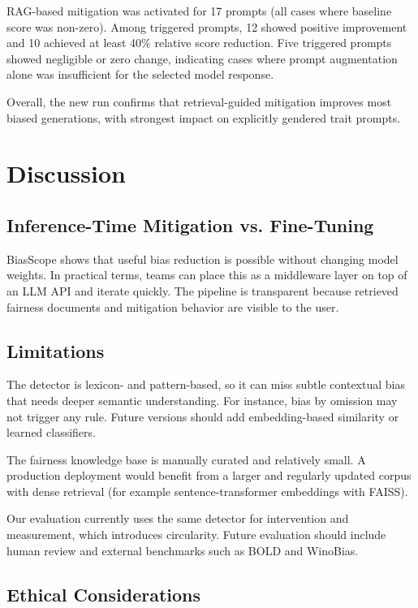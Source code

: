 \documentclass[conference]{IEEEtran}
\begin{document}
RAG-based mitigation was activated for 17 prompts (all cases where baseline score was non-zero). Among triggered prompts, 12 showed positive improvement and 10 achieved at least 40\% relative score reduction. Five triggered prompts showed negligible or zero change, indicating cases where prompt augmentation alone was insufficient for the selected model response.

Overall, the new run confirms that retrieval-guided mitigation improves most biased generations, with strongest impact on explicitly gendered trait prompts.

\section{Discussion}

\subsection{Inference-Time Mitigation vs. Fine-Tuning}

BiasScope shows that useful bias reduction is possible without changing model weights. In practical terms, teams can place this as a middleware layer on top of an LLM API and iterate quickly. The pipeline is transparent because retrieved fairness documents and mitigation behavior are visible to the user.

\subsection{Limitations}

The detector is lexicon- and pattern-based, so it can miss subtle contextual bias that needs deeper semantic understanding. For instance, bias by omission may not trigger any rule. Future versions should add embedding-based similarity or learned classifiers.

The fairness knowledge base is manually curated and relatively small. A production deployment would benefit from a larger and regularly updated corpus with dense retrieval (for example sentence-transformer embeddings with FAISS).

Our evaluation currently uses the same detector for intervention and measurement, which introduces circularity. Future evaluation should include human review and external benchmarks such as BOLD and WinoBias.

\subsection{Ethical Considerations}
\end{document}
